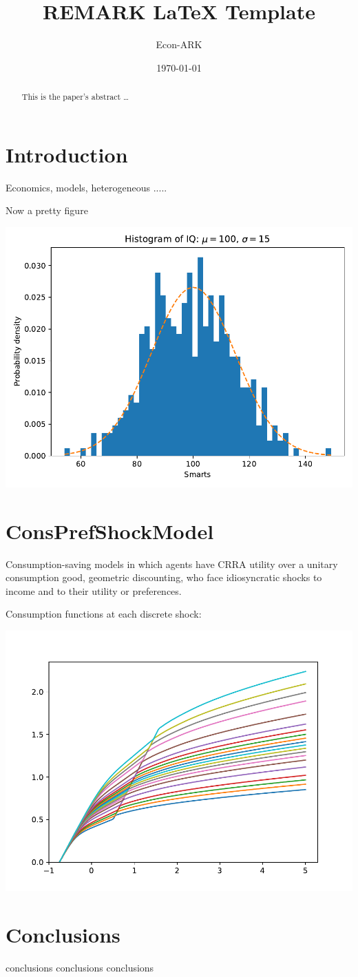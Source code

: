 \documentclass[12pt]{article}
\title{REMARK \LaTeX{} Template}
\author{
        Econ-ARK
}
\date{\today}
\begin{document}
\maketitle

\begin{abstract}
This is the paper's abstract \ldots
\end{abstract}

\section{Introduction}

Economics, models, heterogeneous .....

Now a pretty figure

\includegraphics[scale=0.8]{dist}


\section{ConsPrefShockModel}

Consumption-saving models in which agents have CRRA utility over a unitary consumption good, geometric discounting, who face idiosyncratic shocks to income and to their utility or preferences.

Consumption functions at each discrete shock:

\includegraphics[scale=0.8]{cFunc}


\section{Conclusions}\label{conclusions}

conclusions
conclusions
conclusions
\end{document}
